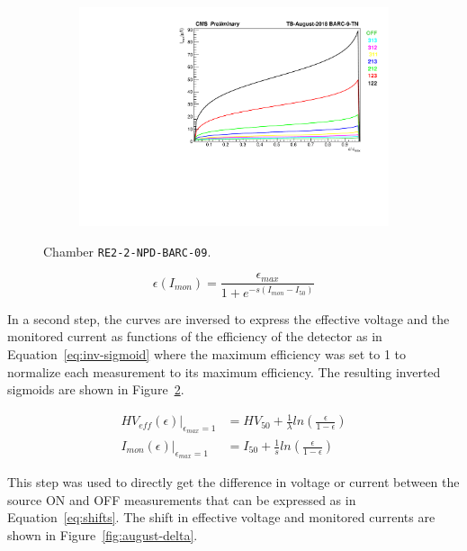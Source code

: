 \begin{figure}
\begin{subfigure}{\linewidth}
    		\includegraphics[width = \linewidth]{fig/chapt5/Inv-Imon-Graph-BARC-9-TN.pdf}
        	\caption{\label{fig:august-inv-sig:C}}
    	\end{subfigure}
		\caption{\label{fig:august-inv-sig} Chamber \texttt{RE2-2-NPD-BARC-09}.}
	\end{figure}
	
	\begin{equation}
	\label{eq:ISigmoid}
	\epsilon(I_{mon}) = \frac{\epsilon_{max}}{1+e^{-s(I_{mon}-I_{50})}}
	\end{equation}
	
	In a second step, the curves are inversed to express the effective voltage and the monitored current as functions of the efficiency of the detector as in Equation~\ref{eq:inv-sigmoid} where the maximum efficiency was set to 1 to normalize each measurement to its maximum efficiency. The resulting inverted sigmoids are shown in Figure~\ref{fig:august-inv-sig}.
	
	\begin{equation}
	\label{eq:inv-sigmoid}
		\begin{aligned}
	HV_{eff}(\epsilon)\vert_{\epsilon_{max}=1} &= HV_{50} + \frac{1}{\lambda}ln\left(\frac{\epsilon}{1-\epsilon}\right)\\
	I_{mon}(\epsilon)\vert_{\epsilon_{max}=1} &= I_{50} + \frac{1}{s}ln\left(\frac{\epsilon}{1-\epsilon}\right)
		\end{aligned}
	\end{equation}
	
	This step was used to directly get the difference in voltage or current between the source ON and OFF measurements that can be expressed as in Equation~\ref{eq:shifts}. The shift in effective voltage and monitored currents are shown in Figure~\ref{fig:august-delta}.
	
